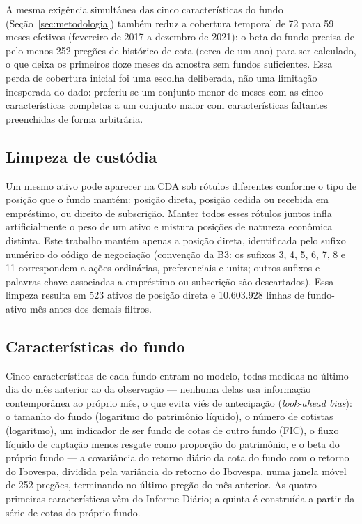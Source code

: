 \documentclass[11pt,a4paper]{article}
\begin{document}
A mesma exigência simultânea das cinco características do fundo (Seção~\ref{sec:metodologia})
também reduz a cobertura temporal de 72 para 59 meses efetivos (fevereiro de 2017 a dezembro de
2021): o beta do fundo precisa de pelo menos 252 pregões de histórico de cota (cerca de um ano)
para ser calculado, o que deixa os primeiros doze meses da amostra sem fundos suficientes. Essa
perda de cobertura inicial foi uma escolha deliberada, não uma limitação inesperada do dado:
preferiu-se um conjunto menor de meses com as cinco características completas a um conjunto
maior com características faltantes preenchidas de forma arbitrária.

\FloatBarrier
\subsection{Limpeza de custódia}

Um mesmo ativo pode aparecer na CDA sob rótulos diferentes conforme o tipo de posição que o
fundo mantém: posição direta, posição cedida ou recebida em empréstimo, ou direito de
subscrição. Manter todos esses rótulos juntos infla artificialmente o peso de um ativo e mistura
posições de natureza econômica distinta. Este trabalho mantém apenas a posição direta,
identificada pelo sufixo numérico do código de negociação (convenção da B3: os sufixos 3, 4, 5,
6, 7, 8 e 11 correspondem a ações ordinárias, preferenciais e units; outros sufixos e palavras-chave
associadas a empréstimo ou subscrição são descartados). Essa limpeza resulta em 523 ativos de
posição direta e 10.603.928 linhas de fundo-ativo-mês antes dos demais filtros.

\FloatBarrier
\subsection{Características do fundo}

Cinco características de cada fundo entram no modelo, todas medidas no último dia do mês
anterior ao da observação --- nenhuma delas usa informação contemporânea ao próprio mês, o que
evita viés de antecipação (\emph{look-ahead bias}): o tamanho do fundo (logaritmo do
patrimônio líquido), o número de cotistas (logaritmo), um indicador de ser fundo de cotas de
outro fundo (FIC), o fluxo líquido de captação menos resgate como proporção do patrimônio, e o
beta do próprio fundo --- a covariância do retorno diário da cota do fundo com o retorno do
Ibovespa, dividida pela variância do retorno do Ibovespa, numa janela móvel de 252 pregões,
terminando no último pregão do mês anterior. As quatro primeiras características vêm do Informe
Diário; a quinta é construída a partir da série de cotas do próprio fundo.
\end{document}
